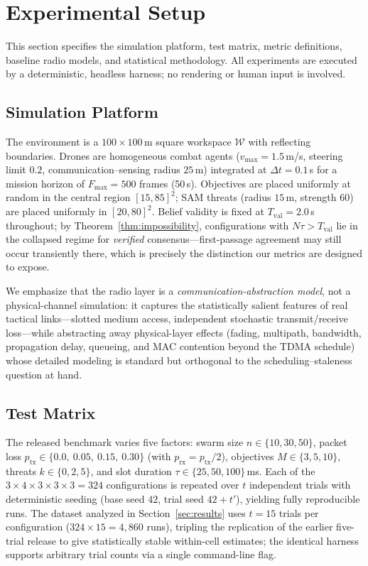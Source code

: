 \section{Experimental Setup}\label{sec:setup}

This section specifies the simulation platform, test matrix, metric definitions, baseline radio models, and statistical methodology.
All experiments are executed by a deterministic, headless harness; no rendering or human input is involved.

\subsection{Simulation Platform}
The environment is a $100 \times 100$\,m square workspace $\mathcal{W}$ with reflecting boundaries.
Drones are homogeneous combat agents ($v_{\max} = 1.5$\,m/s, steering limit $0.2$, communication--sensing radius $25$\,m) integrated at $\Delta t = 0.1$\,s for a mission horizon of $F_{\max} = 500$ frames (50\,s).
Objectives are placed uniformly at random in the central region $[15, 85]^2$; SAM threats (radius $15$\,m, strength $60$) are placed uniformly in $[20, 80]^2$.
Belief validity is fixed at $T_{\mathrm{val}} = 2.0$\,s throughout; by Theorem~\ref{thm:impossibility}, configurations with $N\tau > T_{\mathrm{val}}$ lie in the collapsed regime for \emph{verified} consensus---first-passage agreement may still occur transiently there, which is precisely the distinction our metrics are designed to expose.

We emphasize that the radio layer is a \emph{communication-abstraction model}, not a physical-channel simulation: it captures the statistically salient features of real tactical links---slotted medium access, independent stochastic transmit/receive loss---while abstracting away physical-layer effects (fading, multipath, bandwidth, propagation delay, queueing, and MAC contention beyond the TDMA schedule) whose detailed modeling is standard but orthogonal to the scheduling--staleness question at hand.

\subsection{Test Matrix}\label{sec:test-matrix}
The released benchmark varies five factors:
swarm size $n \in \{10, 30, 50\}$,
packet loss $p_{\mathrm{tx}} \in \{0.0,\ 0.05,\ 0.15,\ 0.30\}$ (with $p_{\mathrm{rx}} = p_{\mathrm{tx}}/2$),
objectives $M \in \{3, 5, 10\}$,
threats $k \in \{0, 2, 5\}$, and
slot duration $\tau \in \{25, 50, 100\}$\,ms.
Each of the $3 \times 4 \times 3 \times 3 \times 3 = 324$ configurations is repeated over $t$ independent trials with deterministic seeding (base seed $42$, trial seed $42 + t'$), yielding fully reproducible runs.
The dataset analyzed in Section~\ref{sec:results} uses $t = 15$ trials per configuration ($324 \times 15 = 4{,}860$ runs), tripling the replication of the earlier five-trial release to give statistically stable within-cell estimates; the identical harness supports arbitrary trial counts via a single command-line flag.

